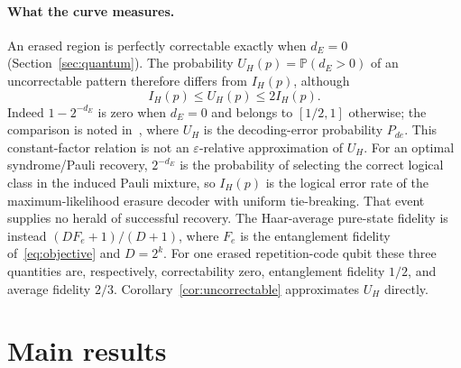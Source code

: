 \documentclass[11pt]{article}
\theoremstyle{remark}
\newcommand{\Prob}{\mathbb P}
\newcommand{\eps}{\varepsilon}
\begin{document}
\paragraph{What the curve measures.}
An erased region is perfectly correctable exactly when \(d_E=0\)
(Section~\ref{sec:quantum}). The probability \(U_H(p)=\Prob(d_E>0)\) of an
uncorrectable pattern therefore differs from \(I_H(p)\), although
\[
 I_H(p)\le U_H(p)\le2I_H(p).
\]
Indeed \(1-2^{-d_E}\) is zero when \(d_E=0\) and belongs to
\([1/2,1]\) otherwise; the comparison is noted
in~\cite{ashikhmin2020}, where \(U_H\) is the decoding-error probability
\(P_{de}\). This constant-factor relation is not an
\(\eps\)-relative approximation of \(U_H\).
For an optimal syndrome/Pauli recovery, \(2^{-d_E}\)
is the probability of selecting the correct logical class in the
induced Pauli mixture, so \(I_H(p)\) is the logical error rate of the
maximum-likelihood erasure decoder with uniform tie-breaking. That event
supplies no herald of successful recovery. The Haar-average pure-state
fidelity is instead \((DF_e+1)/(D+1)\), where \(F_e\) is the
entanglement fidelity of~\eqref{eq:objective} and \(D=2^k\). For one erased repetition-code
qubit these three quantities are, respectively, correctability zero,
entanglement fidelity \(1/2\), and average fidelity \(2/3\).
Corollary~\ref{cor:uncorrectable} approximates \(U_H\) directly.

\section{Main results}
\label{sec:results}
\end{document}

